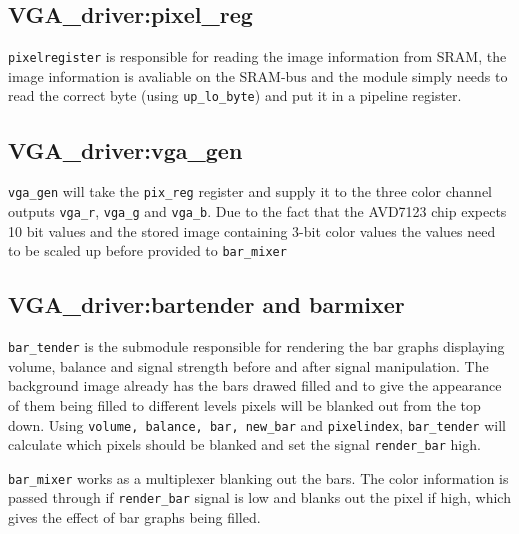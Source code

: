 \subsection{VGA\_driver:pixel\_reg}
\verb=pixelregister= is responsible for reading the image information from SRAM, the image information is avaliable
on the SRAM-bus and the module simply needs to read the correct byte (using \verb=up_lo_byte=) and put it in a pipeline
register.

\subsection{VGA\_driver:vga\_gen}
\verb+vga_gen+ will take the \verb=pix_reg= register and supply it to the three color channel outputs 
\verb=vga_r=, \verb=vga_g= and \verb=vga_b=. Due to the fact that the AVD7123 chip expects 10 bit values and the stored image
containing 3-bit color values the values need to be scaled up before provided to \verb+bar_mixer+ 

\subsection{VGA\_driver:bartender and barmixer}\label{bartender}
\verb+bar_tender+ is the submodule responsible for rendering the bar graphs displaying volume, balance and
signal strength before and after signal manipulation. The background image already has the bars drawed filled
and to give the appearance of them being filled to different levels pixels will be blanked out from the top down. Using \verb=volume, balance, bar, new_bar= and \verb=pixelindex=, \verb+bar_tender+ will calculate which pixels should be blanked and set the signal \verb=render_bar= high.

\verb+bar_mixer+ works as a multiplexer blanking out the bars. The color information is passed through if \verb=render_bar= signal is low and blanks out the pixel if high, which gives the effect of bar graphs being filled.
